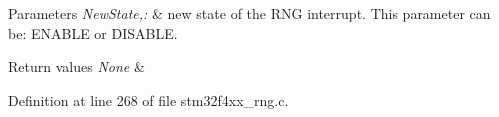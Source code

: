\begin{DoxyParams}{Parameters}
{\em New\-State,\-:} & new state of the R\-N\-G interrupt. This parameter can be\-: E\-N\-A\-B\-L\-E or D\-I\-S\-A\-B\-L\-E. \\
\hline
\end{DoxyParams}

\begin{DoxyRetVals}{Return values}
{\em None} & \\
\hline
\end{DoxyRetVals}


Definition at line 268 of file stm32f4xx\-\_\-rng.\-c.

